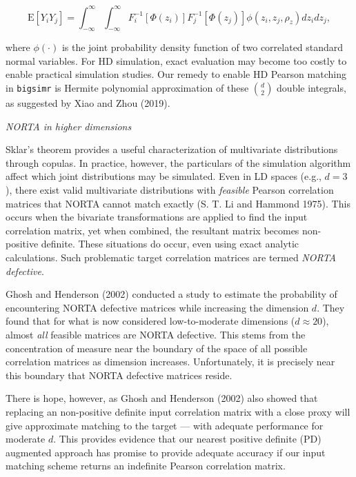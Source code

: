 \documentclass{article}
\begin{document}
\begin{equation}
    \mathrm{E}\left[Y_i Y_j\right] = \int_{-\infty}^{\infty} \int_{-\infty}^{\infty} F_i^{-1}\left[\Phi(z_i)\right] F_j^{-1}\left[\Phi(z_j)\right] \phi(z_i, z_j, \rho_z) dz_i dz_j,
    \label{eq:pearsonIntegralRelation}
\end{equation}

where \(\phi(\cdot)\) is the joint probability density function of two
correlated standard normal variables. For HD simulation, exact
evaluation may become too costly to enable practical simulation studies.
Our remedy to enable HD Pearson matching in \texttt{bigsimr} is Hermite
polynomial approximation of these \(\binom{d}{2}\) double integrals, as
suggested by Xiao and Zhou (2019).

\emph{NORTA in higher dimensions}

Sklar's theorem provides a useful characterization of multivariate
distributions through copulas. In practice, however, the particulars of
the simulation algorithm affect which joint distributions may be
simulated. Even in LD spaces (e.g., \(d=3\)), there exist valid
multivariate distributions with \emph{feasible} Pearson correlation
matrices that NORTA cannot match exactly (S. T. Li and Hammond 1975).
This occurs when the bivariate transformations are applied to find the
input correlation matrix, yet when combined, the resultant matrix
becomes non-positive definite. These situations do occur, even using
exact analytic calculations. Such problematic target correlation
matrices are termed \emph{NORTA defective}.

Ghosh and Henderson (2002) conducted a study to estimate the probability
of encountering NORTA defective matrices while increasing the dimension
\(d\). They found that for what is now considered low-to-moderate
dimensions (\(d \approx 20\)), almost \emph{all} feasible matrices are
NORTA defective. This stems from the concentration of measure near the
boundary of the space of all possible correlation matrices as dimension
increases. Unfortunately, it is precisely near this boundary that NORTA
defective matrices reside.

There is hope, however, as Ghosh and Henderson (2002) also showed that
replacing an non-positive definite input correlation matrix with a close
proxy will give approximate matching to the target --- with adequate
performance for moderate \(d\). This provides evidence that our nearest
positive definite (PD) augmented approach has promise to provide
adequate accuracy if our input matching scheme returns an indefinite
Pearson correlation matrix.
\end{document}
